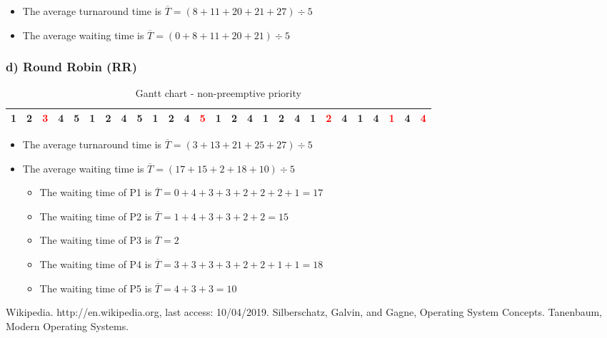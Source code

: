 \documentclass[11pt]{article}
\begin{document}
\begin{itemize}
    \item The average turnaround time is $\overline T = (8 + 11 + 20 + 21 + 27) \div 5 $
    \item The average waiting time is $\overline T = (0 + 8 + 11 + 20 + 21) \div 5 $
\end{itemize}

\subsubsection*{d) Round Robin (RR)}

\begin{table}[!htp]
    \centering            %
    \def\arraystretch{2}  %
    
    \begin{tabular}{|l|l|l|l|l|l|l|l|l|l|l|l|l|l|l|l|l|l|l|l|l|l|l|l|l|l|l|}
        \hline
        1&2&\textcolor{red}{3}&4&5&
        1&2&4&5&
        1&2&4&\textcolor{red}{5}&
        1&2&4&
        1&2&4&
        1&\textcolor{red}{2}&4&
        1&4&
        \textcolor{red}{1}&4&
        \textcolor{red}{4} \\
        \hline
    \end{tabular}

    \caption{Gantt chart - non-preemptive priority}
\end{table}
\begin{itemize}
    \item The average turnaround time is $\overline T = (3 + 13 + 21 + 25 + 27) \div 5 $
    \item The average waiting time is $\overline T = (17 + 15 + 2 + 18 + 10) \div 5 $
    \begin{itemize}
        \item The waiting time of P1 is $\overline T = 0 + 4 + 3 + 3 + 2 + 2 + 2 + 1 = 17$
        \item The waiting time of P2 is $\overline T = 1 + 4 + 3 + 3 + 2 + 2 = 15$
        \item The waiting time of P3 is $\overline T = 2$
        \item The waiting time of P4 is $\overline T = 3 + 3 + 3 + 3 + 2 + 2 + 1 + 1 = 18$
        \item The waiting time of P5 is $\overline T = 4 + 3 + 3 = 10$
    \end{itemize}
\end{itemize}



\newpage

\begin{thebibliography}{80}
     Wikipedia. http://en.wikipedia.org, last access: 10/04/2019.
      Silberschatz, Galvin, and Gagne, Operating System Concepts.
     Tanenbaum, Modern Operating Systems.
\end{thebibliography}
\end{document}
